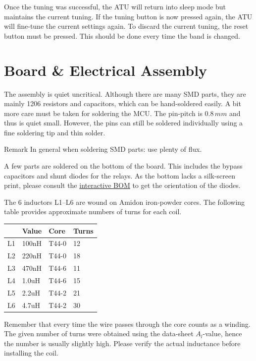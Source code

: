 \documentclass[10pt, a4paper,twoside]{scrartcl}
\newenvironment{remark}{\begin{bclogo}[couleur=blue!30,arrondi=.1,logo=\bcinfo,ombre=true]{Remark}}{\end{bclogo}}
\begin{document}
Once the tuning was successful, the ATU will return into sleep mode but maintains the current tuning. If the tuning button is now pressed again, the ATU will fine-tune the current settings again. To discard the current tuning, the reset button must be pressed. This should be done every time the band is changed.

\section{Board \& Electrical Assembly}
The assembly is quiet uncritical. Although there are many SMD parts, they are mainly 1206 resistors and capacitors, which can be hand-soldered easily. A bit more care must be taken for soldering the MCU. The pin-pitch is $0.8\,mm$ and thus is quiet small. However, the pins can still be soldered individually using a fine soldering tip and thin solder. 

\begin{remark}
In general when soldering SMD parts: use plenty of flux. 
\end{remark}

A few parts are soldered on the bottom of the board. This includes the bypass capacitors and shunt diodes for the relays. As the bottom lacks a silk-screen print, please consult the \href{https://dm3mat.darc.de/atu/ATU-ibom.html}{interactive BOM} to get the orientation of the diodes.

The 6 inductors L1--L6 are wound on Amidon iron-powder cores. The following table provides approximate numbers of turns for each coil. 

\begin{center}
\begin{tabular}{|l|l|l|l|} \hline
    & Value & Core  & Turns \\ \hline 
 L1 & 100nH & T44-0 & 12 \\ 
 L2 & 220nH & T44-0 & 18 \\ 
 L3 & 470nH & T44-6 & 11 \\ 
 L4 & 1.0uH & T44-6 & 15 \\ 
 L5 & 2.2uH & T44-2 & 21 \\ 
 L6 & 4.7uH & T44-2 & 30 \\ \hline
\end{tabular}
\end{center}

Remember that every time the wire passes through the core counts as a winding. The given number of turns were obtained using the data-sheet $A_l$-value, hence the number is usually slightly high. Please verify the actual inductance before installing the coil.
\end{document}
